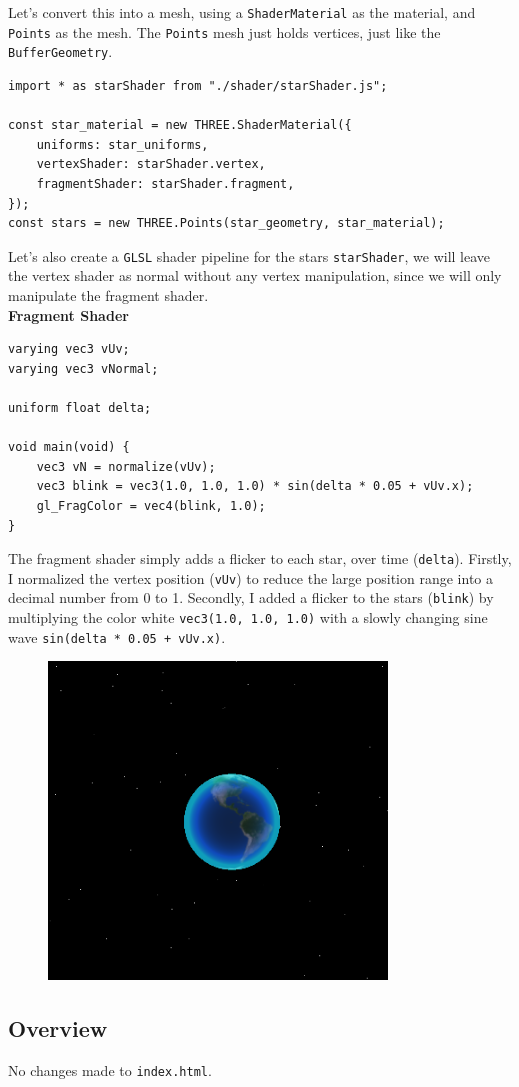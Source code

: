 Let's convert this into a mesh, using a \verb|ShaderMaterial| as the material, and \verb|Points| as the mesh. The \verb|Points| mesh just holds vertices, just like the \verb|BufferGeometry|.
\begin{lstlisting}
import * as starShader from "./shader/starShader.js";

const star_material = new THREE.ShaderMaterial({ 
    uniforms: star_uniforms,
    vertexShader: starShader.vertex,
    fragmentShader: starShader.fragment,
});
const stars = new THREE.Points(star_geometry, star_material);
\end{lstlisting}
\newpage
Let's also create a \verb|GLSL| shader pipeline for the stars \verb|starShader|, we will leave the vertex shader as normal without any vertex manipulation, since we will only manipulate the fragment shader. \\
\textbf{Fragment Shader}
\begin{lstlisting}
varying vec3 vUv;
varying vec3 vNormal;

uniform float delta;

void main(void) {
    vec3 vN = normalize(vUv);
    vec3 blink = vec3(1.0, 1.0, 1.0) * sin(delta * 0.05 + vUv.x);
    gl_FragColor = vec4(blink, 1.0);
}
\end{lstlisting}
The fragment shader simply adds a flicker to each star, over time (\verb|delta|). Firstly, I normalized the vertex position (\verb|vUv|) to reduce the large position range into a decimal number from 0 to 1. Secondly, I added a flicker to the stars (\verb|blink|) by multiplying the color white \verb|vec3(1.0, 1.0, 1.0)| with a slowly changing sine wave \verb|sin(delta * 0.05 + vUv.x)|.
\begin{figure}[ht]
\centering
\includegraphics[width=0.5\linewidth]{images/stars}
\caption{}
\label{fig:stars}
\end{figure}
\newpage
\subsection{Overview}
No changes made to \verb|index.html|. \\

